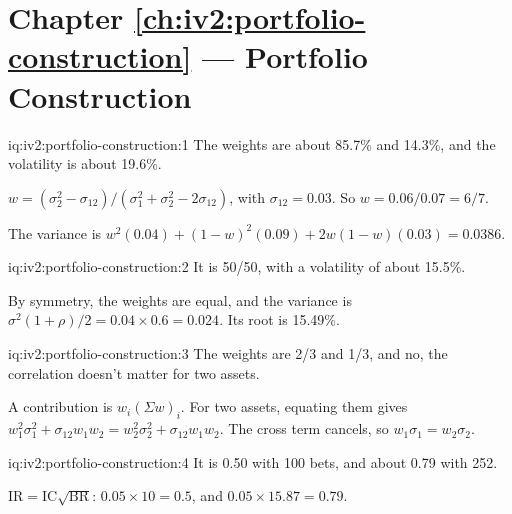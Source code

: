 \section*{Chapter \ref{ch:iv2:portfolio-construction} --- Portfolio Construction}

\begin{solution}{iq:iv2:portfolio-construction:1}
The weights are about 85.7\% and 14.3\%, and the volatility is about 19.6\%.

$w = (\sigma_2^2 - \sigma_{12})/(\sigma_1^2 + \sigma_2^2 - 2\sigma_{12})$, with $\sigma_{12} = 0.03$. So $w = 0.06/0.07 = 6/7$.

The variance is $w^2(0.04) + (1 - w)^2(0.09) + 2w(1 - w)(0.03) = 0.0386$.

\end{solution}

\begin{solution}{iq:iv2:portfolio-construction:2}
It is 50/50, with a volatility of about 15.5\%.

By symmetry, the weights are equal, and the variance is $\sigma^2(1 + \rho)/2 = 0.04 \times 0.6 = 0.024$. Its root is 15.49\%.

\end{solution}

\begin{solution}{iq:iv2:portfolio-construction:3}
The weights are 2/3 and 1/3, and no, the correlation doesn't matter for two assets.

A contribution is $w_i(\Sigma w)_i$. For two assets, equating them gives $w_1^2\sigma_1^2 + \sigma_{12}w_1w_2 = w_2^2\sigma_2^2 + \sigma_{12}w_1w_2$. The cross term cancels, so $w_1\sigma_1 = w_2\sigma_2$.

\end{solution}

\begin{solution}{iq:iv2:portfolio-construction:4}
It is 0.50 with 100 bets, and about 0.79 with 252.

$\mathrm{IR} = \mathrm{IC}\sqrt{\mathrm{BR}}$: $0.05 \times 10 = 0.5$, and $0.05 \times 15.87 = 0.79$.

\end{solution}

